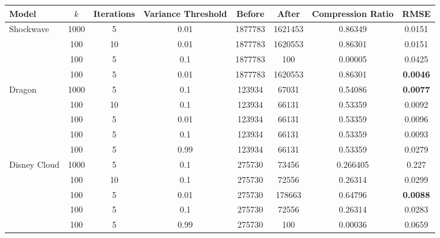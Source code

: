 \begin{figure}[H]
{        \begin{tabular}{|l|ccc|cccc|}
            \toprule
            \hline
            Model        & $k$  & Iterations & Variance Threshold & Before  & After   & Compression Ratio & RMSE            \\
            \hline
            \midrule
            Shockwave    & 1000 & 5          & 0.01               & 1877783 & 1621453 & 0.86349           & 0.0151          \\
                         & 100  & 10         & 0.01               & 1877783 & 1620553 & 0.86301           & 0.0151          \\
                         & 100  & 5          & 0.1                & 1877783 & 100     & 0.00005           & 0.0425          \\
                         & 100  & 5          & 0.01               & 1877783 & 1620553 & 0.86301           & \textbf{0.0046} \\
            \hline
            \midrule
            Dragon       & 1000 & 5          & 0.1                & 123934  & 67031   & 0.54086           & \textbf{0.0077} \\
                         & 100  & 10         & 0.1                & 123934  & 66131   & 0.53359           & 0.0092          \\
                         & 100  & 5          & 0.01               & 123934  & 66131   & 0.53359           & 0.0096          \\
                         & 100  & 5          & 0.1                & 123934  & 66131   & 0.53359           & 0.0093          \\
                         & 100  & 5          & 0.99               & 123934  & 66131   & 0.53359           & 0.0279          \\
            \hline
            \midrule
            Disney Cloud & 1000 & 5          & 0.1                & 275730  & 73456   & 0.266405          & 0.227           \\
                         & 100  & 10         & 0.1                & 275730  & 72556   & 0.26314           & 0.0299          \\
                         & 100  & 5          & 0.01               & 275730  & 178663  & 0.64796           & \textbf{0.0088} \\
                         & 100  & 5          & 0.1                & 275730  & 72556   & 0.26314           & 0.0283          \\
                         & 100  & 5          & 0.99               & 275730  & 100     & 0.00036           & 0.0659          \\

\end{tabular}}
\end{figure}
